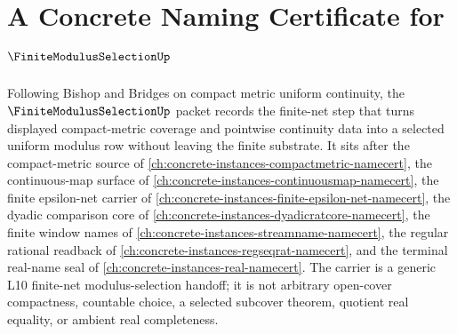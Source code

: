 \chapter{A Concrete Naming Certificate for $\FiniteModulusSelectionUp$}
\label{ch:concrete-instances-finite-modulus-selection-namecert}

Following Bishop and Bridges on compact metric uniform continuity, the $\FiniteModulusSelectionUp$ packet records the finite-net step that turns displayed compact-metric coverage and pointwise continuity data into a selected uniform modulus row without leaving the finite substrate. It sits after the compact-metric source of \autoref{ch:concrete-instances-compactmetric-namecert}, the continuous-map surface of \autoref{ch:concrete-instances-continuousmap-namecert}, the finite epsilon-net carrier of \autoref{ch:concrete-instances-finite-epsilon-net-namecert}, the dyadic comparison core of \autoref{ch:concrete-instances-dyadicratcore-namecert}, the finite window names of \autoref{ch:concrete-instances-streamname-namecert}, the regular rational readback of \autoref{ch:concrete-instances-regseqrat-namecert}, and the terminal real-name seal of \autoref{ch:concrete-instances-real-namecert}. The carrier is a generic L10 finite-net modulus-selection handoff; it is not arbitrary open-cover compactness, countable choice, a selected subcover theorem, quotient real equality, or ambient real completeness.

